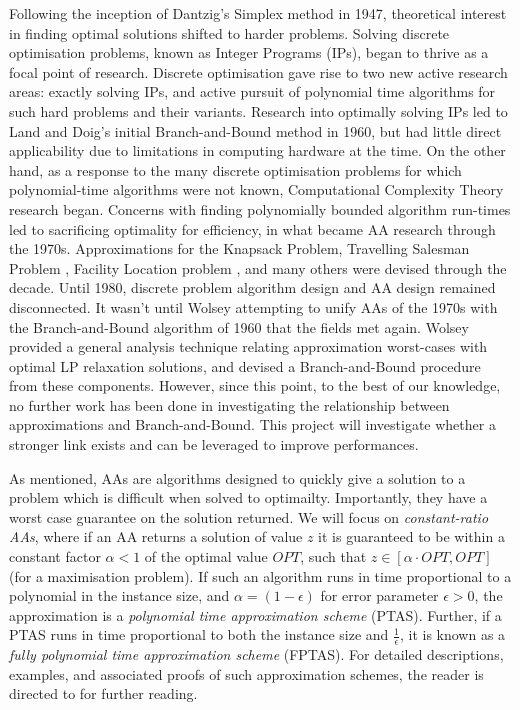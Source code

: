 \documentclass[12pt, a4paper]{article}
\begin{document}
Following the inception of Dantzig's \cite{Dantzig} Simplex method in 1947, theoretical interest in finding optimal solutions shifted to harder problems. Solving discrete optimisation problems, known as Integer Programs (IPs), began to thrive as a focal point of research. Discrete optimisation gave rise to two new active research areas: exactly solving IPs, and active pursuit of polynomial time algorithms for such hard problems and their variants. Research into optimally solving IPs led to Land and Doig's initial Branch-and-Bound method \cite{LandDoig} in 1960, but had little direct applicability due to limitations in computing hardware at the time. On the other hand, as a response to the many discrete optimisation problems for which polynomial-time algorithms were not known, Computational Complexity Theory research began\cite{Cook}. Concerns with finding polynomially bounded algorithm run-times led to sacrificing optimality for efficiency, in what became AA research through the 1970s. Approximations for the Knapsack Problem\cite{IbarraKim}, Travelling Salesman Problem \cite{CristofidesTSP}, Facility Location problem \cite{CornuejolsFisherNemhauser}, and many others were devised through the decade. Until 1980, discrete problem algorithm design and AA design remained disconnected. It wasn't until Wolsey \cite{WOLSEY} attempting to unify AAs of the 1970s with the Branch-and-Bound algorithm of 1960 that the fields met again. Wolsey provided a general analysis technique relating approximation worst-cases with optimal LP relaxation solutions, and devised a Branch-and-Bound procedure from these components. However, since this point, to the best of our knowledge, no further work has been done in investigating the relationship between approximations and Branch-and-Bound. This project will investigate whether a stronger link exists and can be leveraged to improve performances. 

As mentioned, AAs are algorithms designed to quickly give a solution to a problem which is difficult when solved to optimailty. Importantly, they have a worst case guarantee on the solution returned. We will focus on \emph{constant-ratio AAs}, where if an AA returns a solution of value $z$ it is guaranteed to be within a constant factor $\alpha < 1$ of the optimal value $OPT$, such that $z \in [\alpha \cdot OPT, OPT]$ (for a maximisation problem). If such an algorithm runs in time proportional to a polynomial in the instance size, and $\alpha = (1-\epsilon)$ for error parameter $\epsilon > 0$, the approximation is a \emph{polynomial time approximation scheme} (PTAS). Further, if a PTAS runs in time proportional to both the instance size and $\frac{1}{\epsilon}$, it is known as a \emph{fully polynomial time approximation scheme} (FPTAS). For detailed descriptions, examples, and associated proofs of such approximation schemes, the reader is directed to \cite{BOOK:2} for further reading.
\end{document}
